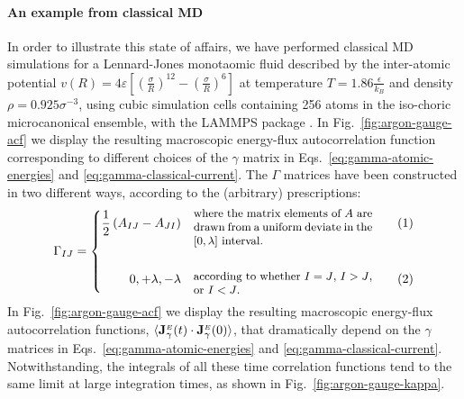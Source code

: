 \paragraph{An example from classical MD}
In order to illustrate this state of affairs, we have performed classical MD simulations for a Lennard-Jones monotaomic fluid described by the inter-atomic potential $v(R) = 4\varepsilon \left[ \left( \frac{\sigma}{R}\right)^{12} - \left(\frac{\sigma}{R} \right)^{6} \right]$ at temperature $T=1.86 \frac{\epsilon}{k_B}$ and density $\rho=0.925 \sigma^{-3}$, using cubic simulation cells containing 256 atoms in the iso-choric microcanonical ensemble, with the LAMMPS package \cite{LAMMPS1995}. 
In Fig.~\ref{fig:argon-gauge-acf} we display the resulting macroscopic energy-flux autocorrelation function corresponding to different choices of the $\gamma$ matrix in Eqs.~\eqref{eq:gamma-atomic-energies} and \eqref{eq:gamma-classical-current}. The $\Gamma$ matrices have been constructed in two different ways,
according to the (arbitrary) prescriptions:
\begin{equation}
\setbox0=\vbox{\hsize=50mm \small\noindent where the matrix
      elements of $A$ are drawn from a uniform deviate  in the
      $[0,\lambda]$ interval.}
\setbox1 \vbox{\hsize=50mm \small\noindent according to whether $I=J$,
  $I>J$, or $I<J$.}
\Gamma_{IJ}= \left \{
  \begin{alignedat}{2}
    \frac{1}{2} \left(A_{IJ}-A_{JI}\right ) & \quad\raise -.5\ht0
    \box0 && \qquad (1) \\
\\
    0, +\lambda, -\lambda & \quad\raise -0.5\ht1 \box1 && \qquad (2) \\
  \end{alignedat} \right .
\label{eq:gamma-definitions}
\end{equation}
In Fig.~\ref{fig:argon-gauge-acf} we display the resulting macroscopic energy-flux autocorrelation functions, $\langle \mathbf{J}_{\gamma}^{{\scriptscriptstyle E}}(t) \cdot\mathbf{J}_{\gamma}^{{\scriptscriptstyle E}}(0)\rangle$, that dramatically depend on the $\gamma$ matrices in Eqs.~\eqref{eq:gamma-atomic-energies} and \eqref{eq:gamma-classical-current}.  Notwithstanding, the integrals of all these time correlation functions tend to the same limit at large integration times, as shown in Fig.~\ref{fig:argon-gauge-kappa}.

